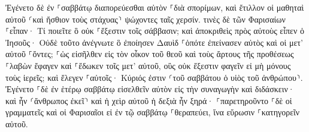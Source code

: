 \documentclass{openreader}
\begin{document}
Ἐγένετο δὲ ἐν ⸀σαββάτῳ διαπορεύεσθαι αὐτὸν ⸀διὰ σπορίμων, καὶ ἔτιλλον οἱ μαθηταὶ αὐτοῦ ⸂καὶ ἤσθιον τοὺς στάχυας⸃ ψώχοντες ταῖς χερσίν. 
τινὲς δὲ τῶν Φαρισαίων ⸀εἶπαν· Τί ποιεῖτε ὃ οὐκ ⸀ἔξεστιν τοῖς σάββασιν; 
καὶ ἀποκριθεὶς πρὸς αὐτοὺς εἶπεν ὁ Ἰησοῦς· Οὐδὲ τοῦτο ἀνέγνωτε ὃ ἐποίησεν Δαυὶδ ⸀ὁπότε ἐπείνασεν αὐτὸς καὶ οἱ μετ’ αὐτοῦ ⸀ὄντες; 
⸀ὡς εἰσῆλθεν εἰς τὸν οἶκον τοῦ θεοῦ καὶ τοὺς ἄρτους τῆς προθέσεως ⸀λαβὼν ἔφαγεν καὶ ⸀ἔδωκεν τοῖς μετ’ αὐτοῦ, οὓς οὐκ ἔξεστιν φαγεῖν εἰ μὴ μόνους τοὺς ἱερεῖς; 
καὶ ἔλεγεν ⸀αὐτοῖς· Κύριός ἐστιν ⸂τοῦ σαββάτου ὁ υἱὸς τοῦ ἀνθρώπου⸃. 
Ἐγένετο ⸀δὲ ἐν ἑτέρῳ σαββάτῳ εἰσελθεῖν αὐτὸν εἰς τὴν συναγωγὴν καὶ διδάσκειν· καὶ ἦν ⸂ἄνθρωπος ἐκεῖ⸃ καὶ ἡ χεὶρ αὐτοῦ ἡ δεξιὰ ἦν ξηρά· 
⸀παρετηροῦντο ⸀δὲ οἱ γραμματεῖς καὶ οἱ Φαρισαῖοι εἰ ἐν τῷ σαββάτῳ ⸀θεραπεύει, ἵνα εὕρωσιν ⸀κατηγορεῖν αὐτοῦ. 
\end{document}
